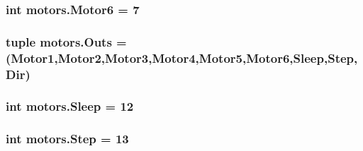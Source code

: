 \subsubsection[{\texorpdfstring{Motor6}{Motor6}}]{\setlength{\rightskip}{0pt plus 5cm}int motors.\+Motor6 = 7}\hypertarget{namespacemotors_a0f78268a0cef59be9898e8fdfb689c74}{}\label{namespacemotors_a0f78268a0cef59be9898e8fdfb689c74}
\subsubsection[{\texorpdfstring{Outs}{Outs}}]{\setlength{\rightskip}{0pt plus 5cm}tuple motors.\+Outs = ({\bf Motor1},{\bf Motor2},{\bf Motor3},{\bf Motor4},{\bf Motor5},{\bf Motor6},{\bf Sleep},{\bf Step},{\bf Dir})}\hypertarget{namespacemotors_aed37b3cce8f8d9ef7ecc6860b4970527}{}\label{namespacemotors_aed37b3cce8f8d9ef7ecc6860b4970527}
\subsubsection[{\texorpdfstring{Sleep}{Sleep}}]{\setlength{\rightskip}{0pt plus 5cm}int motors.\+Sleep = 12}\hypertarget{namespacemotors_a0612d2632b6b8107d3a0443f6df076c4}{}\label{namespacemotors_a0612d2632b6b8107d3a0443f6df076c4}
\subsubsection[{\texorpdfstring{Step}{Step}}]{\setlength{\rightskip}{0pt plus 5cm}int motors.\+Step = 13}\hypertarget{namespacemotors_a19f3c46dd2407b6b3c4ce3d50d7a6af1}{}\label{namespacemotors_a19f3c46dd2407b6b3c4ce3d50d7a6af1}

